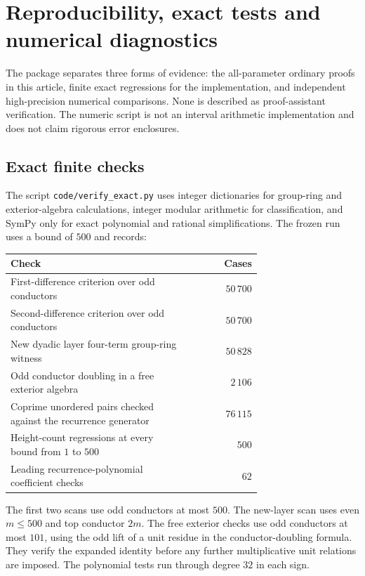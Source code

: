 \section{Reproducibility, exact tests and numerical diagnostics}
\label{sec:verification}

The package separates three forms of evidence: the all-parameter ordinary
proofs in this article, finite exact regressions for the implementation,
and independent high-precision numerical comparisons. None is described
as proof-assistant verification. The numeric script is not an interval
arithmetic implementation and does not claim rigorous error enclosures.

\subsection{Exact finite checks}

The script \nolinkurl{code/verify_exact.py} uses integer dictionaries for
group-ring and exterior-algebra calculations, integer modular arithmetic
for classification, and SymPy only for exact polynomial and rational
simplifications. The frozen run uses a bound of $500$ and records:
\begin{center}
\begin{tabular}{p{0.71\linewidth}r}
\toprule
Check & Cases\\
\midrule
First-difference criterion over odd conductors & $50\,700$\\
Second-difference criterion over odd conductors & $50\,700$\\
New dyadic layer four-term group-ring witness & $50\,828$\\
Odd conductor doubling in a free exterior algebra & $2\,106$\\
Coprime unordered pairs checked against the recurrence generator & $76\,115$\\
Height-count regressions at every bound from $1$ to $500$ & $500$\\
Leading recurrence-polynomial coefficient checks & $62$\\
\bottomrule
\end{tabular}
\end{center}

The first two scans use odd conductors at most $500$. The new-layer
scan uses even $m\le500$ and top conductor $2m$. The free exterior
checks use odd conductors at most $101$, using the odd lift of a unit
residue in the conductor-doubling formula. They verify the expanded
identity before any further multiplicative unit relations are imposed.
The polynomial tests run through degree $32$ in each sign.


